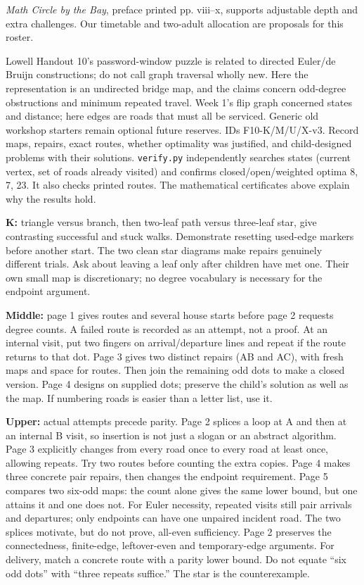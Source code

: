 \documentclass[11pt]{article}
\begin{document}
\emph{Math Circle by the Bay}, preface printed pp. viii--x, supports adjustable depth and extra challenges. Our timetable and two-adult allocation are proposals for this roster.

Lowell Handout 10's password-window puzzle is related to directed Euler/de Bruijn constructions; do not call graph traversal wholly new. Here the representation is an undirected bridge map, and the claims concern odd-degree obstructions and minimum repeated travel. Week 1's flip graph concerned states and distance; here edges are roads that must all be serviced. Generic old workshop starters remain optional future reserves.
IDs F10-K/M/U/X-v3. Record maps, repairs, exact routes, whether optimality was justified, and child-designed problems with their solutions. \texttt{verify.py} independently searches states (current vertex, set of roads already visited) and confirms closed/open/weighted optima 8, 7, 23. It also checks printed routes. The mathematical certificates above explain why the results hold.


\newpage
{}
\textbf{K:} triangle versus branch, then two-leaf path versus three-leaf star, give contrasting successful and stuck walks. Demonstrate resetting used-edge markers before another start. The two clean star diagrams make repairs genuinely different trials. Ask about leaving a leaf only after children have met one. Their own small map is discretionary; no degree vocabulary is necessary for the endpoint argument.

\textbf{Middle:} page 1 gives routes and several house starts before page 2 requests degree counts. A failed route is recorded as an attempt, not a proof. At an internal visit, put two fingers on arrival/departure lines and repeat if the route returns to that dot. Page 3 gives two distinct repairs (AB and AC), with fresh maps and space for routes. Then join the remaining odd dots to make a closed version. Page 4 designs on supplied dots; preserve the child's solution as well as the map. If numbering roads is easier than a letter list, use it.

\textbf{Upper:} actual attempts precede parity. Page 2 splices a loop at A and then at an internal B visit, so insertion is not just a slogan or an abstract algorithm. Page 3 explicitly changes from every road once to every road at least once, allowing repeats. Try two routes before counting the extra copies. Page 4 makes three concrete pair repairs, then changes the endpoint requirement. Page 5 compares two six-odd maps: the count alone gives the same lower bound, but one attains it and one does not.
For Euler necessity, repeated visits still pair arrivals and departures; only endpoints can have one unpaired incident road. The two splices motivate, but do not prove, all-even sufficiency. Page 2 preserves the connectedness, finite-edge, leftover-even and temporary-edge arguments. For delivery, match a concrete route with a parity lower bound. Do not equate ``six odd dots'' with ``three repeats suffice.'' The star is the counterexample.
\end{document}

